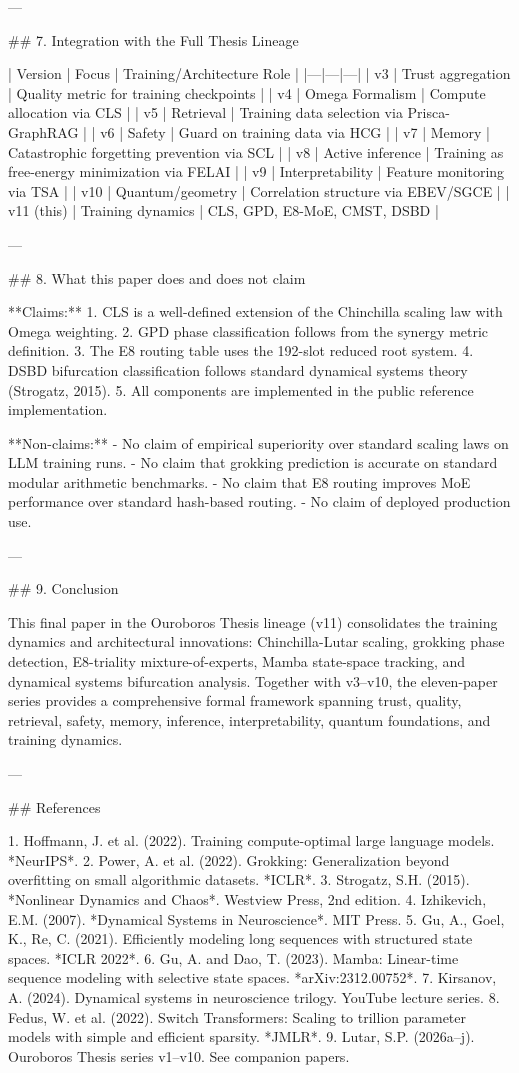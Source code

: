 ---

## 7. Integration with the Full Thesis Lineage

| Version | Focus | Training/Architecture Role |
|---|---|---|
| v3 | Trust aggregation | Quality metric for training checkpoints |
| v4 | Omega Formalism | Compute allocation via CLS |
| v5 | Retrieval | Training data selection via Prisca-GraphRAG |
| v6 | Safety | Guard on training data via HCG |
| v7 | Memory | Catastrophic forgetting prevention via SCL |
| v8 | Active inference | Training as free-energy minimization via FELAI |
| v9 | Interpretability | Feature monitoring via TSA |
| v10 | Quantum/geometry | Correlation structure via EBEV/SGCE |
| v11 (this) | Training dynamics | CLS, GPD, E8-MoE, CMST, DSBD |

---

## 8. What this paper does and does not claim

**Claims:**
1. CLS is a well-defined extension of the Chinchilla scaling law with Omega weighting.
2. GPD phase classification follows from the synergy metric definition.
3. The E8 routing table uses the 192-slot reduced root system.
4. DSBD bifurcation classification follows standard dynamical systems theory (Strogatz, 2015).
5. All components are implemented in the public reference implementation.

**Non-claims:**
- No claim of empirical superiority over standard scaling laws on LLM training runs.
- No claim that grokking prediction is accurate on standard modular arithmetic benchmarks.
- No claim that E8 routing improves MoE performance over standard hash-based routing.
- No claim of deployed production use.

---

## 9. Conclusion

This final paper in the Ouroboros Thesis lineage (v11) consolidates the training dynamics and architectural innovations: Chinchilla-Lutar scaling, grokking phase detection, E8-triality mixture-of-experts, Mamba state-space tracking, and dynamical systems bifurcation analysis. Together with v3--v10, the eleven-paper series provides a comprehensive formal framework spanning trust, quality, retrieval, safety, memory, inference, interpretability, quantum foundations, and training dynamics.

---

## References

1. Hoffmann, J. et al. (2022). Training compute-optimal large language models. *NeurIPS*.
2. Power, A. et al. (2022). Grokking: Generalization beyond overfitting on small algorithmic datasets. *ICLR*.
3. Strogatz, S.H. (2015). *Nonlinear Dynamics and Chaos*. Westview Press, 2nd edition.
4. Izhikevich, E.M. (2007). *Dynamical Systems in Neuroscience*. MIT Press.
5. Gu, A., Goel, K., Re, C. (2021). Efficiently modeling long sequences with structured state spaces. *ICLR 2022*.
6. Gu, A. and Dao, T. (2023). Mamba: Linear-time sequence modeling with selective state spaces. *arXiv:2312.00752*.
7. Kirsanov, A. (2024). Dynamical systems in neuroscience trilogy. YouTube lecture series.
8. Fedus, W. et al. (2022). Switch Transformers: Scaling to trillion parameter models with simple and efficient sparsity. *JMLR*.
9. Lutar, S.P. (2026a--j). Ouroboros Thesis series v1--v10. See companion papers.
